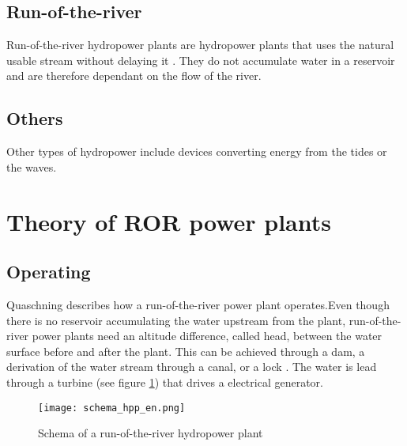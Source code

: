 \subsection{Run-of-the-river}

Run-of-the-river hydropower plants are hydropower plants that uses the natural usable stream without delaying it \cite{vgb}. They do not accumulate water in a reservoir and are therefore dependant on the flow of the river.

\subsection{Others}

Other types of hydropower include devices converting energy from the tides or the waves.

\section{Theory of ROR power plants}
\subsection{Operating}
Quaschning \cite{quaschning} describes how a run-of-the-river power plant operates.Even though there is no reservoir accumulating the water upstream from the plant, run-of-the-river power plants need an altitude difference, called head, between the water surface before and after the plant. This can be achieved through a dam, a derivation of the water stream through a canal, or a lock \cite{tdi_petites_centrales}. The water is lead through a turbine (see figure \ref{schema_hpp}) that drives a electrical generator.
\begin{figure}[H]
\texttt{[image: schema\_hpp\_en.png]}
\caption[Schema of a run-of-the-river hydropower plant]{Schema of a run-of-the-river hydropower plant \cite{quaschning}}
\centering
\label{schema_hpp}
\end{figure}

